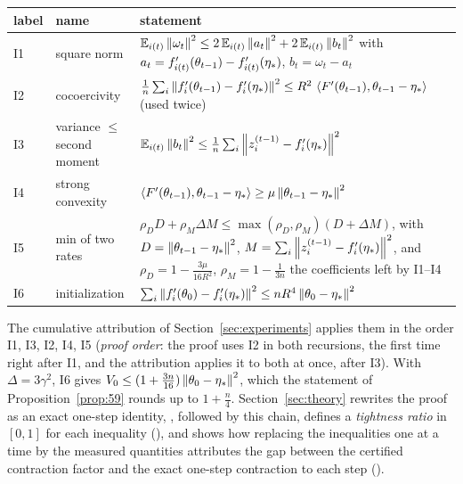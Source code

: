\begin{center}
\begin{tabular}{llp{9.8cm}}
\toprule
label & name & statement \\
\midrule
I1 & square norm & \raggedright $\mathbb{E}_{i(t)}\left\|\omega_t\right\|^2 \le 2\,\mathbb{E}_{i(t)}\left\|a_t\right\|^2 + 2\,\mathbb{E}_{i(t)}\left\|b_t\right\|^2$ with $a_t = f'_{i(t)}(\theta_{t-1}) - f'_{i(t)}(\eta_\ast)$, $b_t = \omega_t - a_t$ \tabularnewline
I2 & cocoercivity & $\frac1n\sum_i \left\|f'_i(\theta_{t-1}) - f'_i(\eta_\ast)\right\|^2 \le R^2\,\left\langle F'(\theta_{t-1}), \theta_{t-1} - \eta_\ast \right\rangle$ (used twice) \\
I3 & variance $\le$ second moment & $\mathbb{E}_{i(t)}\left\|b_t\right\|^2 \le \frac1n \sum_i \left\|z_i^{(t-1)} - f'_i(\eta_\ast)\right\|^2$ \\
I4 & strong convexity & $\left\langle F'(\theta_{t-1}), \theta_{t-1} - \eta_\ast \right\rangle \ge \mu\left\|\theta_{t-1} - \eta_\ast\right\|^2$ \\
I5 & min of two rates & \raggedright $\rho_D D + \rho_M \Delta M \le \max(\rho_D, \rho_M)(D + \Delta M)$, with
$D=\left\|\theta_{t-1}-\eta_\ast\right\|^2$, $M=\sum_i\left\|z_i^{(t-1)}-f'_i(\eta_\ast)\right\|^2$, and $\rho_D=1-\frac{3\mu}{16R^2}$,
$\rho_M=1-\frac1{3n}$ the coefficients left by I1--I4 \tabularnewline
I6 & initialization & $\sum_i \left\|f'_i(\theta_0) - f'_i(\eta_\ast)\right\|^2 \le nR^4\left\|\theta_0 - \eta_\ast\right\|^2$ \\
\bottomrule
\end{tabular}
\end{center}
The cumulative attribution of Section~\ref{sec:experiments} applies them in the order I1, I3, I2, I4, I5
(\emph{proof order}: the proof uses I2 in both recursions, the first time right after I1, and the attribution applies
it to both at once, after I3). With $\Delta=3\gamma^2$, I6 gives $V_0\le(1+\frac{3n}{16})\left\|\theta_0-\eta_\ast\right\|^2$,
which the statement of Proposition~\ref{prop:59} rounds up to $1+\frac n4$.
Section~\ref{sec:theory} rewrites the proof as an exact one-step identity, , followed by
this chain, defines a \emph{tightness ratio} in $[0,1]$ for each inequality (), and shows how
replacing the inequalities one at a time by the measured quantities attributes the gap between the certified
contraction factor and the exact one-step contraction to each step ().

